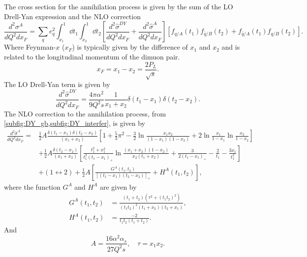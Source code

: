 The cross section for the annihilation process is given by the sum of the LO Drell-Yan expression and
the NLO correction \cite{kubar1980}
\begin{equation}
	\frac{d^2\sigma^A}{dQ^2dx_{F}} = \sum_q e^2_q \int^1_{x_1} \dd{t_1} \int^1_{x_2} \dd{t_2}
	\left[ \frac{d^2\hat{\sigma}^{DY}}{dQ^2dx_F}+\frac{d^2\hat{\sigma}^{A}}{dQ^2dx_F} \right]
	\left[f_{q/A}\left(t_1\right)f_{\bar{q}/B}\left(t_2\right) +
	f_{\bar{q}/A}\left(t_1\right)f_{q/B}\left(t_2\right)
	\right].
\end{equation}
Where Feynman-$x$ ($x_F$) is typically given by the difference of $x_1$ and $x_2$ and is related to the
longitudinal momentum of the dimuon pair.
\begin{equation}
	x_F = x_1 - x_2 = \frac{2P_L}{\sqrt{s}}.
\end{equation}
The LO Drell-Yan term is given by
\begin{equation}
	\frac{ d^2\hat{\sigma}^{DY} }{dQ^2 dx_F} = \frac{4\pi\alpha^2}{9Q^2 s} \frac{1}{x_1+x_2}\delta\left(t_1-x_1\right)\delta\left(t_2-x_2\right).
\end{equation}
The NLO correction to the annihilation process, from \cref{subfig:DY_gb,subfig:DY_interfer},
is given by
\begin{equation}
\begin{split}
	\frac{d^2\hat{\sigma}^{A}}{dQ^2dx_F} =& \frac{1}{2}A \frac{\delta\left(t_1-x_1\right)\delta\left(t_2-x_2\right)}{\left(x_1+x_2\right)} \left[ 1+\frac{5}{3}\pi^2 - \frac{3}{2}\ln\frac{x_1x_2}{\left(1-x_1\right)\left(1-x_2\right)} + 2\ln\frac{x_1}{1-x_1}\ln\frac{x_2}{1-x_2}\right]\\
	&+\frac{1}{2} A \frac{\delta\left(t_2-x_2\right)}{\left(x_1+x_2\right)}\left[\frac{t_1^2+x_1^2}{t_1^2\left(t_1-x_1\right)_{+}} \ln\frac{\left(x_1+x_2\right)\left(1-x_2\right)}{x_2\left(t_1+x_2\right)} + \frac{3}{2\left(t_1-x_1\right)_{+}} -\frac{2}{t_1} - \frac{3x_1}{t_1^2}\right]\\
	&+\left(1\leftrightarrow 2\right) + \frac{1}{2} A \left[\frac{G^A\left(t_1,t_2\right)}{\left[\left(t_1-x_1\right)\left(t_2-x_2\right)\right]_{+}} +H^A\left(t_1,t_2\right)\right],
\end{split}
\end{equation}
where the function $G^A$ and $H^A$ are given by
\begin{align}
	G^A\left(t_1,t_2\right) &= \frac{\left(t_1+t_2\right)\left(\tau^2+\left(t_1t_2\right)^2\right)}{\left(t_1t_2\right)^2\left(t_1+x_2\right)\left(t_2+x_1\right)},\\
	H^A\left(t_1,t_2\right) &= \frac{-2}{t_1t_2\left(t_1+t_2\right)}.
\end{align}
And
\begin{equation}
	A=\frac{16\alpha^2\alpha_s}{27Q^2s}, \quad \tau=x_1x_2.
\end{equation}

